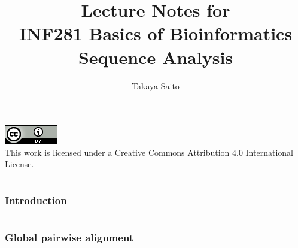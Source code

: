 \documentclass[12pt]{article}
\title{Lecture Notes for \\ INF281 Basics of Bioinformatics Sequence Analysis}
\author{Takaya Saito}
\date{}
\begin{document}
\clearpage\maketitle
\vspace{450px}
\includegraphics[scale=1]{fig00/88x31.png} \\
This work is licensed under a Creative Commons Attribution 4.0 International License.
\thispagestyle{empty}
\pagebreak

\setcounter{page}{1}
\tableofcontents
\pagebreak

\setcounter{page}{1}

\makeatletter 
\renewcommand{\thefigure}{\arabic{section}.\arabic{figure}}
\renewcommand{\thetable}{\arabic{section}.\arabic{table}}
\makeatother

%
%
\part{}

%
%
\setcounter{figure}{0}
\section{Introduction}




\newpage

%
%
\part{}

%
%
\setcounter{figure}{0}
\section{Global pairwise alignment}





\end{document}
